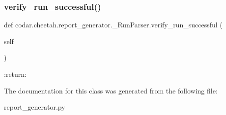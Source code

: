 \subsubsection{\texorpdfstring{verify\+\_\+run\+\_\+successful()}{verify\_run\_successful()}}
{\footnotesize\ttfamily def codar.\+cheetah.\+report\+\_\+generator.\+\_\+\+Run\+Parser.\+verify\+\_\+run\+\_\+successful (\begin{DoxyParamCaption}\item[{}]{self }\end{DoxyParamCaption})}

\begin{DoxyVerb}:return:
\end{DoxyVerb}
 

The documentation for this class was generated from the following file\+:\begin{DoxyCompactItemize}
\item 
report\+\_\+generator.\+py\end{DoxyCompactItemize}
